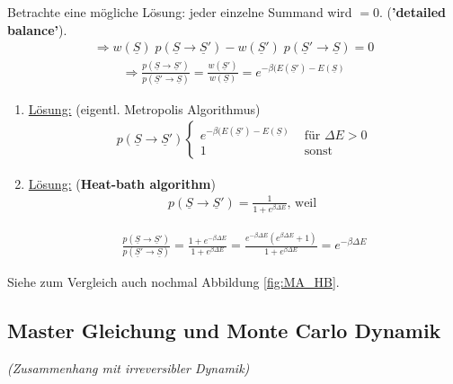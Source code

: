 \documentclass[12pt]{article}
\begin{document}
Betrachte eine mögliche Lösung: jeder einzelne Summand wird $=0$. (\textbf{'detailed balance'}).
 \begin{align}
\Rightarrow   w(\underline{S}) \; p(\underline{S} \rightarrow \underline{S}')- w(\underline{S}') \; p(\underline{S}' \rightarrow \underline{S}) =0 
\end{align}
\begin{align}
\Rightarrow  \frac{p(\underline{S} \rightarrow \underline{S}')}{p(\underline{S}' \rightarrow  \underline{S})} = \frac{w(\underline{S}')}{w(\underline{S})} = e^{-\beta(E(\underline{S}')- E(\underline{S})}
\end{align}
\begin{enumerate}
\item \underline{Lösung:} (eigentl. Metropolis Algorithmus)
 \begin{align}
p(\underline{S} \rightarrow \underline{S}')
\begin{cases}
e^{-\beta(E(\underline{S}')- E(\underline{S})} & \text{ für } \Delta E > 0 \\
1 & \text{ sonst}
\end{cases}
\end{align} 

\item \underline{Lösung:} (\textbf{Heat-bath algorithm})
\begin{align*}
p(\underline{S} \rightarrow \underline{S}') = \frac{1}{1+ e^{\beta \Delta E}} \mbox{, weil } 
\end{align*}

\begin{align*}
\frac{p(\underline{S} \rightarrow \underline{S}')}{p(\underline{S}' \rightarrow \underline{S})} = \frac{1+e^{-\beta \Delta E} }{1+e^{\beta \Delta E}} = \frac{e^{-\beta \Delta E} (e^{\beta \Delta E}+1)}{1+e^{\beta \Delta E}}= e^{-\beta \Delta E}
\end{align*}
\end{enumerate}
Siehe zum Vergleich auch nochmal Abbildung \ref{fig:MA_HB}.



\subsection{Master Gleichung und Monte Carlo Dynamik}
\textit{(Zusammenhang mit irreversibler Dynamik)}\\
\end{document}
